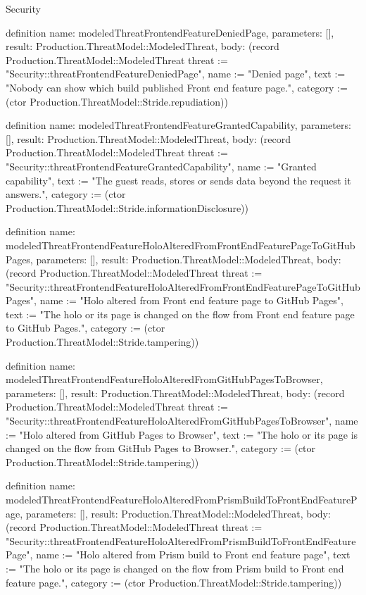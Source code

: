 \begin{lexlean}{Security}
\begin{semanticmodule}
definition{
  name: modeledThreatFrontendFeatureDeniedPage,
  parameters: [],
  result: Production.ThreatModel::ModeledThreat,
  body: (record Production.ThreatModel::ModeledThreat {threat := "Security::threatFrontendFeatureDeniedPage", name := "Denied page", text := "Nobody can show which build published Front end feature page.", category := (ctor Production.ThreatModel::Stride.repudiation)})
}

definition{
  name: modeledThreatFrontendFeatureGrantedCapability,
  parameters: [],
  result: Production.ThreatModel::ModeledThreat,
  body: (record Production.ThreatModel::ModeledThreat {threat := "Security::threatFrontendFeatureGrantedCapability", name := "Granted capability", text := "The guest reads, stores or sends data beyond the request it answers.", category := (ctor Production.ThreatModel::Stride.informationDisclosure)})
}

definition{
  name: modeledThreatFrontendFeatureHoloAlteredFromFrontEndFeaturePageToGitHubPages,
  parameters: [],
  result: Production.ThreatModel::ModeledThreat,
  body: (record Production.ThreatModel::ModeledThreat {threat := "Security::threatFrontendFeatureHoloAlteredFromFrontEndFeaturePageToGitHubPages", name := "Holo altered from Front end feature page to GitHub Pages", text := "The holo or its page is changed on the flow from Front end feature page to GitHub Pages.", category := (ctor Production.ThreatModel::Stride.tampering)})
}

definition{
  name: modeledThreatFrontendFeatureHoloAlteredFromGitHubPagesToBrowser,
  parameters: [],
  result: Production.ThreatModel::ModeledThreat,
  body: (record Production.ThreatModel::ModeledThreat {threat := "Security::threatFrontendFeatureHoloAlteredFromGitHubPagesToBrowser", name := "Holo altered from GitHub Pages to Browser", text := "The holo or its page is changed on the flow from GitHub Pages to Browser.", category := (ctor Production.ThreatModel::Stride.tampering)})
}

definition{
  name: modeledThreatFrontendFeatureHoloAlteredFromPrismBuildToFrontEndFeaturePage,
  parameters: [],
  result: Production.ThreatModel::ModeledThreat,
  body: (record Production.ThreatModel::ModeledThreat {threat := "Security::threatFrontendFeatureHoloAlteredFromPrismBuildToFrontEndFeaturePage", name := "Holo altered from Prism build to Front end feature page", text := "The holo or its page is changed on the flow from Prism build to Front end feature page.", category := (ctor Production.ThreatModel::Stride.tampering)})
}


\end{semanticmodule}
\end{lexlean}
